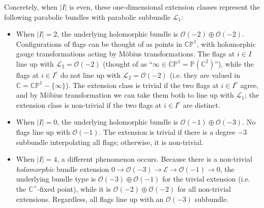 \documentclass[12pt,letterpaper,reqno]{amsart}
\theoremstyle{remark}
\theoremstyle{definition}
\numberwithin{thm}{section}
\numberwithin{equation}{section}
\numberwithin{figure}{section}
\newcommand{\cL}{\ensuremath{\mathcal L}}
\newcommand{\cO}{\ensuremath{\mathcal O}}
\newcommand{\C}{\ensuremath{\mathbb C}}
\newcommand{\CP}{\ensuremath{\mathbb {CP}}}
\newcommand{\cE}{{\mathcal E}}
\begin{document}
Concretely, when $|I|$ is even, these one-dimensional extension classes represent the following parabolic bundles with parabolic subbundle $\cL_1$:
\begin{itemize}
\item When $|I|=2$, the underlying holomorphic bundle is $\cO(-2) \oplus \cO(-2)$. Configurations of flags can be thought of as points in $\CP^1$, with holomorphic gauge transformations acting by M\"obius transformations.  The flags at $i \in I$ line up with $\cL_2=\cO(-2)$ (thought of as ``$\infty \in \CP^1=\mathbb{P}(\C^2)$''), while the flags at $i \in I^c$ do not line up with $\cL_2 =\cO(-2)$ (i.e. they are valued in $\C=\CP^1-\{\infty\}$). The extension class is trivial if the two flags at $i \in I^c$ agree, and by M\"obius transformation we can take them both to line up with $\cL_1$; the extension class is non-trivial if the two flags at $i \in I^c$ are distinct.
\item When $|I|=0$, the underlying holomorphic bundle is $\cO(-1) \oplus \cO(-3)$. No flags line up with $\cO(-1)$. The extension is trivial if there is a degree $-3$ subbundle interpolating all flags; otherwise, it is non-trivial.
\item When $|I|=4$, a different phenomenon occurs.  Because there is a non-trivial \emph{holomorphic} bundle extension $0 \rightarrow \cO(-3) \to \cE \rightarrow \cO(-1) \rightarrow 0$, the underlying bundle type is $\cO(-3) \oplus \cO(-1)$ for the trivial extension (i.e. the $\C^\times$-fixed point), while it is $\cO(-2) \oplus \cO(-2)$ for all non-trivial extensions. Regardless, all flags line up with an $\cO(-3)$ subbundle. 
\end{itemize}
\end{document}
